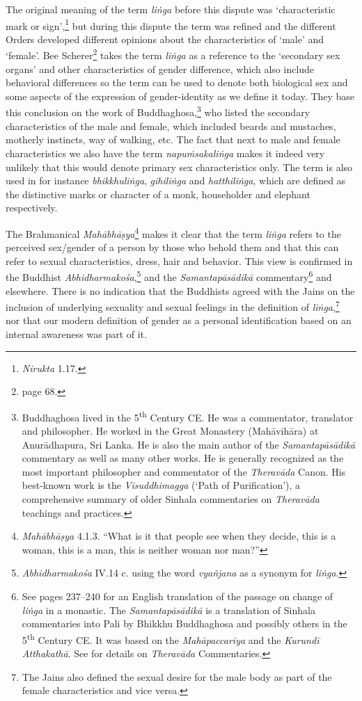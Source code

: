 The original meaning of the term \textit{liṅga} before this dispute was `characteristic mark or sign',\footnote{\textit{Nirukta} 1.17.} but during this dispute the term was refined and the different Orders developed different opinions about the characteristics of `male' and `female'. Bee Scherer\footnote{\cite{scherer} page 68.} takes the term \textit{liṅga} as a reference to the `secondary sex organs' and other characteristics of gender difference, which also include behavioral differences so the term can be used to denote both biological sex and some aspects of the expression of gender-identity as we define it today. They base this conclusion on the work of Buddhaghosa,\footnote{Buddhaghosa lived in the 5\textsuperscript{th} Century CE. He was a commentator, translator and philosopher. He worked in the Great Monastery (Mahāvihāra) at Anurādhapura, Sri Lanka. He is also the main author of the \textit{Samantapāsādikā} commentary as well as many other works. He is generally recognized as the most important philosopher and commentator of the \textit{Theravāda} Canon. His best-known work is the \textit{Visuddhimagga} (`Path of Purification'), a comprehensive summary of older Sinhala commentaries on \textit{Theravāda} teachings and practices.} who listed the secondary characteristics of the male and female, which included beards and mustaches, motherly instincts, way of walking, etc. The fact that next to male and female characteristics we also have the term \textit{napuṁsakaliṅga} makes it indeed very unlikely that this would denote primary sex characteristics only. The term is also used in for instance \textit{bhikkhuliṅga}, \textit{gihiliṅga} and \textit{hatthiliṅga}, which are defined as the distinctive marks or character of a monk, householder and elephant respectively.

The Brahmanical \textit{Mahābhāṣya}\footnote{\textit{Mahābhāṣya} 4.1.3. ``What is it that people see when they decide, this is a woman, this is a man, this is neither woman nor man?''} makes it clear that the term \textit{liṅga} refers to the perceived sex/gender of a person by those who behold them and that this can refer to sexual characteristics, dress, hair and behavior. This view is confirmed in the Buddhist \textit{Abhidharmakośa},\footnote{\textit{Abhidharmakośa} IV.14 c. using the word \textit{vyañjana} as a synonym for \textit{liṅga}.} and the \textit{Samantapāsādikā} commentary\footnote{See \cite{anderson2016} pages 237–240 for an English translation of the passage on change of \textit{liṅga} in a monastic. The \textit{Samantapāsādikā} is a translation of Sinhala commentaries into Pali by Bhikkhu Buddhaghosa and possibly others in the 5\textsuperscript{th} Century CE. It was based on the \textit{Mahāpaccariya} and the \textit{Kurundī Atthakathā}. See \cite{goonesekere} for details on \textit{Theravāda} Commentaries.} and elsewhere. There is no indication that the Buddhists agreed with the Jains on the inclusion of underlying sexuality and sexual feelings in the definition of \textit{liṅga},\footnote{The Jains also defined the sexual desire for the male body as part of the female characteristics and vice versa.} nor that our modern definition of gender as a personal identification based on an internal awareness was part of it.

